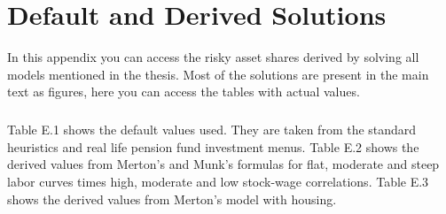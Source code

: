 \chapter{Default and Derived Solutions}
\label{appe}

In this appendix you can access the risky asset shares derived by solving all models mentioned in the thesis. Most of the solutions are present in the main text as figures, here you can access the tables with actual values.

\paragraph{}Table E.1 shows the default values used. They are taken from the standard heuristics and real life pension fund investment menus. Table E.2 shows the derived values from Merton's and Munk's formulas for flat, moderate and steep labor curves times high, moderate and low stock-wage correlations. Table E.3 shows the derived values from Merton's model with housing.
 
